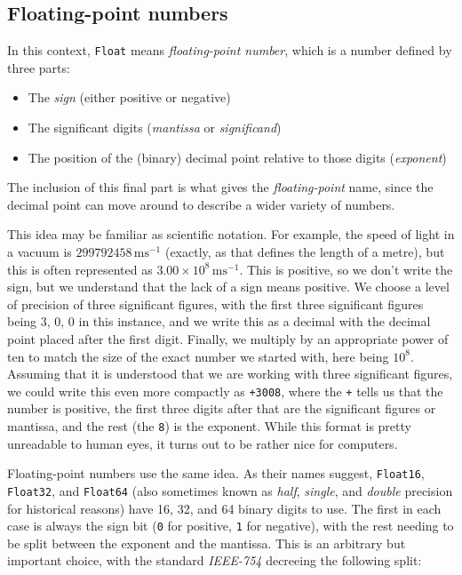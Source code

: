 \documentclass[
  letterpaper,
  DIV=11,
  numbers=noendperiod]{scrreprt}
\begin{document}
\hypertarget{floating-point-numbers}{%
\subsection{Floating-point numbers}\label{floating-point-numbers}}

In this context, \texttt{Float} means \emph{floating-point number},
which is a number defined by three parts:

\begin{itemize}
\item
  The \emph{sign} (either positive or negative)
\item
  The significant digits (\emph{mantissa} or \emph{significand})
\item
  The position of the (binary) decimal point relative to those digits
  (\emph{exponent})
\end{itemize}

The inclusion of this final part is what gives the \emph{floating-point}
name, since the decimal point can move around to describe a wider
variety of numbers.

This idea may be familiar as scientific notation. For example, the speed
of light in a vacuum is \(299792458\,\mathrm{ms}^{-1}\) (exactly, as
that defines the length of a metre), but this is often represented as
\(3.00 \times 10^8 \,\mathrm{ms}^{-1}\). This is positive, so we don't
write the sign, but we understand that the lack of a sign means
positive. We choose a level of precision of three significant figures,
with the first three significant figures being \(3\), \(0\), \(0\) in
this instance, and we write this as a decimal with the decimal point
placed after the first digit. Finally, we multiply by an appropriate
power of ten to match the size of the exact number we started with, here
being \(10^8\). Assuming that it is understood that we are working with
three significant figures, we could write this even more compactly as
\texttt{+3008}, where the \texttt{+} tells us that the number is
positive, the first three digits after that are the significant figures
or mantissa, and the rest (the \texttt{8}) is the exponent. While this
format is pretty unreadable to human eyes, it turns out to be rather
nice for computers.

Floating-point numbers use the same idea. As their names suggest,
\texttt{Float16}, \texttt{Float32}, and \texttt{Float64} (also sometimes
known as \emph{half}, \emph{single}, and \emph{double} precision for
historical reasons) have 16, 32, and 64 binary digits to use. The first
in each case is always the sign bit (\texttt{0} for positive, \texttt{1}
for negative), with the rest needing to be split between the exponent
and the mantissa. This is an arbitrary but important choice, with the
standard \emph{IEEE-754} decreeing the following split:
\end{document}
